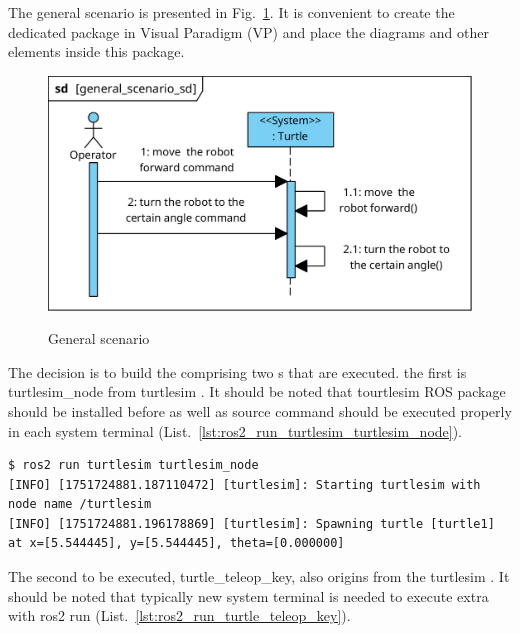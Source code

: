 \documentclass[11pt,oneside,a4paper]{report}
\begin{document}
\pagebreak



The general scenario is presented in Fig.~\ref{fig:general_scenario_sd}. It is convenient to create the dedicated package in Visual Paradigm (VP) and place the diagrams and other elements inside this package.


\begin{figure}[H]
	\centering
	\begin{center}
		{\includegraphics[scale=1.0]{diagrams/general_scenario_sd.png}}
	\end{center}
	\caption{General scenario}
	\label{fig:general_scenario_sd}
\end{figure}


The decision is to build the \stSystem{} comprising two \stNode{}s that are executed. the first is \textsf{turtlesim\_node} \stNode{} from \textsf{turtlesim} \stPackage{}. It should be noted that tourtlesim ROS package should be installed before as well as source command should be executed properly in each system terminal (List.~\ref{lst:ros2_run_turtlesim_turtlesim_node}).

\begin{lstlisting}[style=terminal,label={lst:ros2_run_turtlesim_turtlesim_node},caption={ros2 run turtlesim turtlesim\_node}]
$ ros2 run turtlesim turtlesim_node
[INFO] [1751724881.187110472] [turtlesim]: Starting turtlesim with node name /turtlesim
[INFO] [1751724881.196178869] [turtlesim]: Spawning turtle [turtle1] at x=[5.544445], y=[5.544445], theta=[0.000000]
\end{lstlisting}

The second \stNode{} to be executed, \textsf{turtle\_teleop\_key}, also origins from the \textsf{turtlesim} \stPackage{}. It should be noted that typically new system terminal is needed to execute extra \stNode{} with \textsf{ros2 run} \stCLTool{} (List.~\ref{lst:ros2_run_turtle_teleop_key}).
\end{document}
